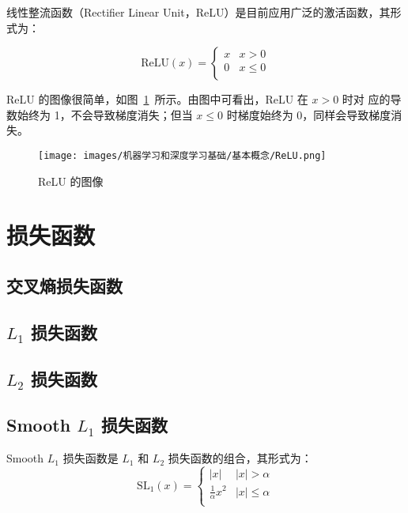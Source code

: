 线性整流函数（Rectifier Linear Unit，ReLU）是目前应用广泛的激活函数，其形式为：

\begin{equation}
  \label{equ:ReLU}
  \mathrm{ReLU}(x) = \left\{
    \begin{array}{lr}
      x & x > 0 \\
      0 & x \leq 0 \\
    \end{array}
  \right.
\end{equation}

ReLU 的图像很简单，如图~\ref{fig:ReLU}~所示。由图中可看出，ReLU 在 $x > 0$ 时对
应的导数始终为 1，不会导致梯度消失；但当 $x \leq 0$ 时梯度始终为 0，同样会导致梯度消失。

\begin{figure}[ht]
  \centering
  \texttt{[image: images/机器学习和深度学习基础/基本概念/ReLU.png]}
  \caption{ReLU 的图像}
  \label{fig:ReLU}
\end{figure}

\section{损失函数}

\subsection{交叉熵损失函数}

\subsection{$L_1$ 损失函数}

\subsection{$L_2$ 损失函数}

\subsection{Smooth $L_1$ 损失函数}
Smooth $L_1$ 损失函数是 $L_1$ 和 $L_2$ 损失函数的组合，其形式为：
\begin{equation}
  \label{equ:SmoothL1}
  \mathrm{SL}_1(x) = \left\{
    \begin{array}{lr}
      |x| & |x| > \alpha \\
      \frac{1}{\alpha} x^2 & |x| \leq \alpha \\
    \end{array}
  \right.
\end{equation}


